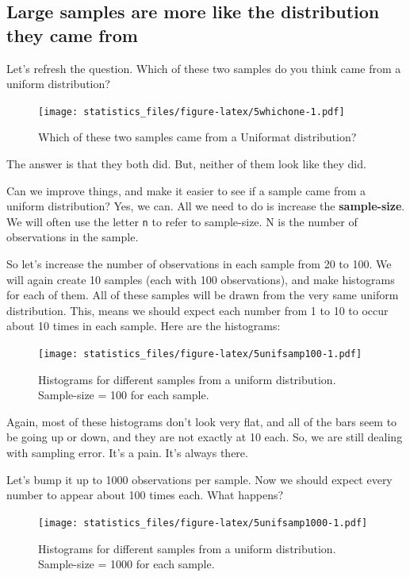 \documentclass[]{book}
\begin{document}
\hypertarget{large-samples-are-more-like-the-distribution-they-came-from}{%
\subsection{Large samples are more like the distribution they came from}\label{large-samples-are-more-like-the-distribution-they-came-from}}

Let's refresh the question. Which of these two samples do you think came from a uniform distribution?

\begin{figure}
\centering
\texttt{[image: statistics\_files/figure-latex/5whichone-1.pdf]}
\caption{\label{fig:5whichone}Which of these two samples came from a Uniformat distribution?}
\end{figure}

The answer is that they both did. But, neither of them look like they did.

Can we improve things, and make it easier to see if a sample came from a uniform distribution? Yes, we can. All we need to do is increase the \textbf{sample-size}. We will often use the letter \texttt{n} to refer to sample-size. N is the number of observations in the sample.

So let's increase the number of observations in each sample from 20 to 100. We will again create 10 samples (each with 100 observations), and make histograms for each of them. All of these samples will be drawn from the very same uniform distribution. This, means we should expect each number from 1 to 10 to occur about 10 times in each sample. Here are the histograms:

\begin{figure}
\centering
\texttt{[image: statistics\_files/figure-latex/5unifsamp100-1.pdf]}
\caption{\label{fig:5unifsamp100}Histograms for different samples from a uniform distribution. Sample-size = 100 for each sample.}
\end{figure}

Again, most of these histograms don't look very flat, and all of the bars seem to be going up or down, and they are not exactly at 10 each. So, we are still dealing with sampling error. It's a pain. It's always there.

Let's bump it up to 1000 observations per sample. Now we should expect every number to appear about 100 times each. What happens?

\begin{figure}
\centering
\texttt{[image: statistics\_files/figure-latex/5unifsamp1000-1.pdf]}
\caption{\label{fig:5unifsamp1000}Histograms for different samples from a uniform distribution. Sample-size = 1000 for each sample.}
\end{figure}
\end{document}
